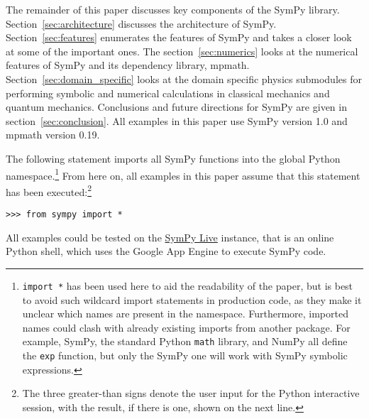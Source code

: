 The remainder of this paper discusses key components of the SymPy library.
Section~\ref{sec:architecture} discusses the architecture of SymPy.
Section~\ref{sec:features} enumerates the features of SymPy and takes a closer
look at some of the important ones. The section~\ref{sec:numerics}
looks at the numerical features of SymPy and its dependency library, mpmath.
Section~\ref{sec:domain_specific} looks at the domain specific physics
submodules for performing symbolic and numerical calculations in classical mechanics
and quantum mechanics. Conclusions and future directions for SymPy are given
in section~\ref{sec:conclusion}.  All examples in this paper use SymPy
version 1.0 and mpmath version 0.19.

The following statement imports all SymPy functions into the global Python
namespace.\footnote{\texttt{import *} has been used here to aid the
  readability of the paper, but is best to avoid such wildcard import
  statements in production code, as they make it unclear which names are
  present in the namespace. Furthermore, imported names could clash with
  already existing imports from another package. For example, SymPy, the
  standard Python \texttt{math} library, and NumPy all define the \texttt{exp}
  function, but only the SymPy one will work with SymPy symbolic expressions.}
From here on, all examples in this paper assume that this statement has been
executed:\footnote{The three greater-than signs denote the user input for the
  Python interactive session, with the result, if there is one, shown on the
  next line.}

\begin{verbatim}
>>> from sympy import *
\end{verbatim}

All examples could be tested on the \href{http://live.sympy.org}{SymPy
Live} instance, that is an online Python shell, which uses the Google
App Engine to execute SymPy code.
